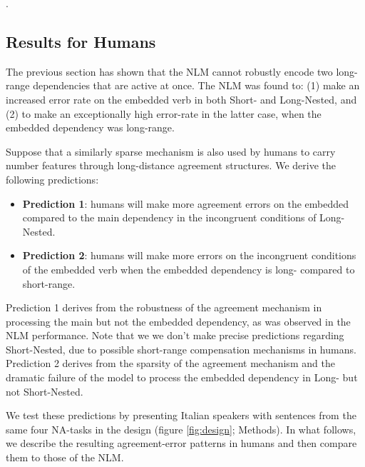 .

\subsection{Results for Humans}
The previous section has shown that the NLM cannot robustly encode two long-range dependencies that are active at once. The NLM was found to: (1) make an increased error rate on the embedded verb in both Short- and Long-Nested, and (2) to make an exceptionally high error-rate in the latter case, when the embedded dependency was long-range.

Suppose that a similarly sparse mechanism is also used by humans to carry number features through long-distance agreement structures. We derive the following predictions:

\begin{itemize}
    \item \textbf{Prediction 1}: humans will make more agreement errors on the embedded compared to the main dependency in the incongruent conditions of Long-Nested. 
    \item \textbf{Prediction 2}: humans will make more errors on the incongruent conditions of the embedded verb when the embedded dependency is long- compared to short-range.
\end{itemize}

Prediction 1 derives from the robustness of the agreement mechanism in processing the main but not the embedded dependency, as was observed in the NLM performance. Note that we we don't make precise predictions regarding Short-Nested, due to possible short-range compensation mechanisms in humans. Prediction 2 derives from the sparsity of the agreement mechanism and the dramatic failure of the model to process the embedded dependency in Long- but not Short-Nested. 

We test these predictions by presenting Italian speakers with sentences from the same four NA-tasks in the design (figure \ref{fig:design}; Methods). In what follows, we describe the resulting agreement-error patterns in humans and then compare them to those of the NLM.

